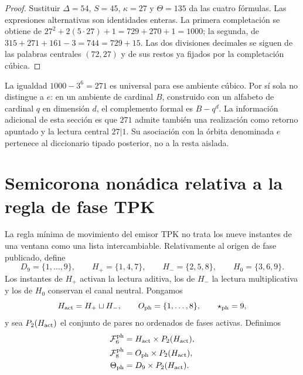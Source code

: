 \begin{proof}
Sustituir \(\Delta=54\), \(S=45\), \(\kappa=27\) y
\(\Theta=135\) da las cuatro fórmulas. Las expresiones alternativas son
identidades enteras. La primera completación se obtiene de
\(27^2+2(5\cdot27)+1=729+270+1=1000\); la segunda, de
\(315+271+161-3=744=729+15\). Las dos divisiones decimales se siguen de
las palabras centrales \((72,27)\) y de sus restos ya fijados por la
completación cúbica.
\end{proof}

La igualdad \(1000-3^6=271\) es universal para ese ambiente cúbico. Por sí
sola no distingue a \(e\): en un ambiente de cardinal \(B\), construido con
un alfabeto de cardinal \(q\) en dimensión \(d\), el complemento formal es
\(B-q^d\). La información adicional de esta sección es que \(271\) admite
también una realización como retorno apuntado y la lectura central \(27|1\).
Su asociación con la órbita denominada \(e\) pertenece al diccionario tipado
posterior, no a la resta aislada.

\section{Semicorona nonádica relativa a la regla de fase TPK}

La regla mínima de movimiento del emisor TPK no trata los nueve instantes de
una ventana como una lista intercambiable. Relativamente al origen de fase
publicado, define
\[
 D_9=\{1,\ldots,9\},
 \qquad
 H_+=\{1,4,7\},
 \qquad
 H_-=\{2,5,8\},
 \qquad
 H_0=\{3,6,9\}.
\]
Los instantes de \(H_+\) activan la lectura aditiva, los de \(H_-\) la
lectura multiplicativa y los de \(H_0\) conservan el canal neutral. Pongamos
\[
 H_{\rm act}=H_+\sqcup H_-,
 \qquad
 O_{\rm ph}=\{1,\ldots,8\},
 \qquad
 \star_{\rm ph}=9,
\]
y sea \(P_2(H_{\rm act})\) el conjunto de pares no ordenados de fases
activas. Definimos
\[
\begin{aligned}
 \mathcal F^{\rm ph}_6&=H_{\rm act}\times P_2(H_{\rm act}),\\
 \mathcal F^{\rm ph}_8&=O_{\rm ph}\times P_2(H_{\rm act}),\\
 \Theta_{\rm ph}&=D_9\times P_2(H_{\rm act}).
\end{aligned}
\]

